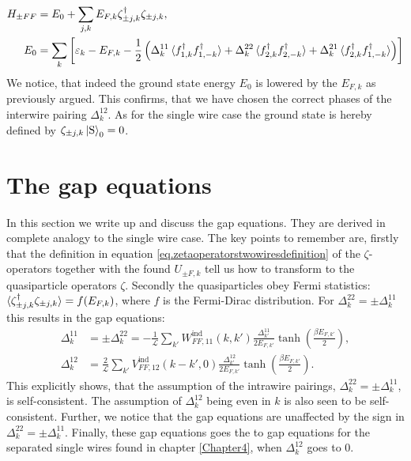 \begin{align}
H_{\pm FF} &= E_0 + \sum_{j,k} E_{F,k}\zeta^\dagger_{\pm j, k}\zeta_{\pm j, k}, \nonumber \\ 
E_0 &= \sum_k \left[\varepsilon_k - E_{F,k} - \frac{1}{2}\left(\Delta^{11}_k\braket{f^\dagger_{1,k}f^\dagger_{1,-k}} + \Delta^{22}_k\braket{f^\dagger_{2,k}f^\dagger_{2,-k}} + \Delta^{21}_k\braket{f^\dagger_{2,k}f^\dagger_{1,-k}} \right) \right] 
\end{align}  
We notice, that indeed the ground state energy $E_0$ is lowered by the $E_{F,k}$ as previously argued. This confirms, that we have chosen the correct phases of the interwire pairing $\Delta^{12}_k$. As for the single wire case the ground state is hereby defined by $\zeta_{\pm j,k}\ket{\text{S}}_0 = 0$. 

\section{The gap equations}
In this section we write up and discuss the gap equations. They are derived in complete analogy to the single wire case. The key points to remember are, firstly that the definition in equation \ref{eq.zetaoperatorstwowiresdefinition} of the $\zeta$-operators together with the found $U_{\pm F,k}$ tell us how to transform to the quasiparticle operators $\zeta$. Secondly the quasiparticles obey Fermi statistics: $\braket{\zeta^\dagger_{\pm j,k}\zeta_{\pm j, k}} = f(E_{F,k})$, where $f$ is the Fermi-Dirac distribution. For $\Delta^{22}_k = \pm \Delta^{11}_k$ this results in the gap equations:
\begin{align}
\Delta^{11}_k &= \pm \Delta^{22}_k = -\frac{1}{\mathcal{L}}\sum_{k'} W^\text{ind}_{FF,11}(k,k')\frac{\Delta^{11}_{k'}}{2E_{F,k'}}\tanh\left(\frac{\beta E_{F,k'}}{2}\right), \nonumber \\
\Delta^{12}_k &= \frac{2}{\mathcal{L}}\sum_{k'} V^\text{ind}_{FF,12}(k - k',0)\frac{\Delta^{12}_{k'}}{2E_{F,k'}}\tanh\left(\frac{\beta E_{F,k'}}{2}\right).
\end{align}
This explicitly shows, that the assumption of the intrawire pairings, $\Delta^{22}_k = \pm \Delta^{11}_k$, is self-consistent. The assumption of $\Delta^{12}_k$ being even in $k$ is also seen to be self-consistent. Further, we notice that the gap equations are unaffected by the sign in $\Delta^{22}_k = \pm \Delta^{11}_k$. Finally, these gap equations goes the to gap equations for the separated single wires found in chapter \ref{Chapter4}, when $\Delta^{12}_k$ goes to $0$.  

